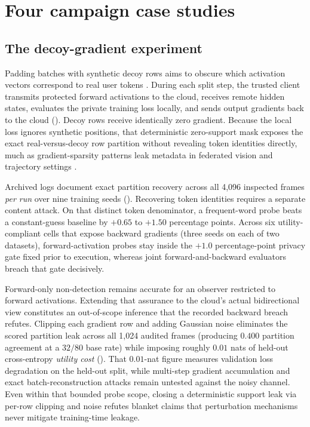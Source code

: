 \section{Four campaign case studies}
\label{sec:cases}

\subsection{The decoy-gradient experiment}
\label{sec:f1}

Padding batches with synthetic decoy rows aims to obscure which activation
vectors correspond to real user tokens \cite{paper1}. During each split
step, the trusted client transmits protected forward activations to the
cloud, receives remote hidden states, evaluates the private training loss
locally, and sends output gradients back to the cloud ().
Decoy rows receive identically zero gradient. Because the local loss
ignores synthetic positions, that deterministic zero-support mask exposes
the exact real-versus-decoy row partition without revealing token
identities directly, much as gradient-sparsity patterns leak metadata in
federated vision and trajectory settings \cite{gisurvey2022,trace2026}.

Archived logs document exact partition recovery across all 4,096 inspected
frames \emph{per run} over nine training seeds (). Recovering
token identities requires a separate content attack. On that distinct token
denominator, a frequent-word probe beats a constant-guess baseline by
$+0.65$ to $+1.50$ percentage points. Across six utility-compliant cells
that expose backward gradients (three seeds on each of two datasets),
forward-activation probes stay inside the $+1.0$ percentage-point privacy
gate fixed prior to execution, whereas joint forward-and-backward
evaluators breach that gate decisively.

Forward-only non-detection remains accurate for an observer restricted to
forward activations. Extending that assurance to the cloud's actual
bidirectional view constitutes an out-of-scope inference that the recorded
backward breach refutes. Clipping each gradient row and adding Gaussian
noise eliminates the scored partition leak across all 1,024 audited frames
(producing $0.400$ partition agreement at a $32/80$ base rate) while
imposing roughly $0.01$ nats of held-out cross-entropy \emph{utility cost}
(). That $0.01$-nat figure measures validation loss degradation
on the held-out split, while multi-step gradient accumulation and exact
batch-reconstruction attacks \cite{dager2024,fedspy2026} remain untested
against the noisy channel. Even within that bounded probe scope, closing a
deterministic support leak via per-row clipping and noise refutes blanket
claims that perturbation mechanisms never mitigate training-time leakage.

